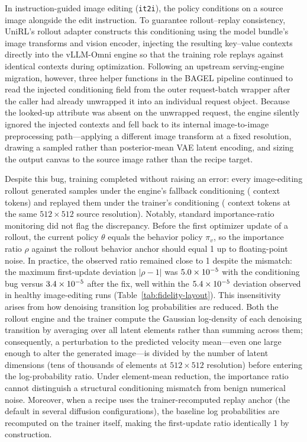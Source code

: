 In instruction-guided image editing (\texttt{it2i}), the policy conditions on a source image alongside the edit instruction.
To guarantee rollout--replay consistency, UniRL's rollout adapter constructs this conditioning using the model bundle's image transforms and vision encoder, injecting the resulting key--value contexts directly into the vLLM-Omni engine so that the training role replays against identical contexts during optimization.
Following an upstream serving-engine migration, however, three helper functions in the BAGEL pipeline continued to read the injected conditioning field from the outer request-batch wrapper after the caller had already unwrapped it into an individual request object.
Because the looked-up attribute was absent on the unwrapped request, the engine silently ignored the injected contexts and fell back to its internal image-to-image preprocessing path---applying a different image transform at a fixed resolution, drawing a sampled rather than posterior-mean VAE latent encoding, and sizing the output canvas to the source image rather than the recipe target.

Despite this bug, training completed without raising an error: every image-editing rollout generated samples under the engine's fallback conditioning (\RFWorkerKv{} context tokens) and replayed them under the trainer's conditioning (\RFTrainerKv{} context tokens at the same $512\times512$ source resolution).
Notably, standard importance-ratio monitoring did not flag the discrepancy.
Before the first optimizer update of a rollout, the current policy $\theta$ equals the behavior policy $\pi_v$, so the importance ratio $\rho$ against the rollout behavior anchor should equal 1 up to floating-point noise.
In practice, the observed ratio remained close to 1 despite the mismatch: the maximum first-update deviation $|\rho - 1|$ was $5.0\times10^{-5}$ with the conditioning bug versus $3.4\times10^{-5}$ after the fix, well within the $5.4\times10^{-5}$ deviation observed in healthy image-editing runs (Table~\ref{tab:fidelity-layout}).
This insensitivity arises from how denoising transition log probabilities are reduced.
Both the rollout engine and the trainer compute the Gaussian log-density of each denoising transition by averaging over all latent elements rather than summing across them; consequently, a perturbation to the predicted velocity mean---even one large enough to alter the generated image---is divided by the number of latent dimensions (tens of thousands of elements at $512\times512$ resolution) before entering the log-probability ratio.
Under element-mean reduction, the importance ratio cannot distinguish a structural conditioning mismatch from benign numerical noise.
Moreover, when a recipe uses the trainer-recomputed replay anchor (the default in several diffusion configurations), the baseline log probabilities are recomputed on the trainer itself, making the first-update ratio identically 1 by construction.


